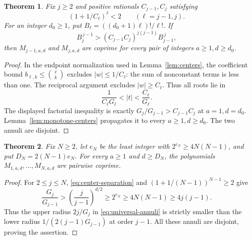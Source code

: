 \documentclass[11pt]{article}
\newtheorem{theorem}{Theorem}
\begin{document}
\begin{theorem}\label{thm:rational-annulus-cutoff}
Fix $j\ge2$ and positive rationals $C_{j-1},C_j$ satisfying
\[
 (1+1/C_\ell)^\ell<2\qquad(\ell=j-1,j).
\]
For an integer $d_0\ge1$, put
$B_\ell=((d_0+1)\ell)!/\ell!$.
If
\[
 B_j^{\,j-1}>
 (C_{j-1}C_j)^{j(j-1)}B_{j-1}^{\,j},
\]
then $M_{j-1,a,d}$ and $M_{j,a,d}$ are coprime for every pair
of integers $a\ge1,d\ge d_0$.
\end{theorem}
\begin{proof}
In the endpoint normalization used in Lemma~\ref{lem:centers},
the coefficient bound $b_{\ell,k}\le\binom\ell k$ excludes
$|w|\le1/C_\ell$: the sum of nonconstant terms is less than one.
The reciprocal argument excludes $|w|\ge C_\ell$.
Thus all roots lie in
\[
 \frac1{C_\ell G_\ell}<|t|<\frac{C_\ell}{G_\ell}.
\]
The displayed factorial inequality is exactly
$G_j/G_{j-1}>C_{j-1}C_j$ at $a=1,d=d_0$.
Lemma~\ref{lem:monotone-centers} propagates it to every
$a\ge1,d\ge d_0$. The two annuli are disjoint.
\end{proof}

\begin{theorem}\label{thm:gapbound}
Fix $N\ge2$, let $e_N$ be the least integer with
$2^{e_N}\ge4N(N-1)$, and put $D_N=2(N-1)e_N$.
For every $a\ge1$ and $d\ge D_N$, the polynomials
$M_{1,a,d},\ldots,M_{N,a,d}$ are pairwise coprime.
\end{theorem}
\begin{proof}
For $2\le j\le N$, \eqref{eq:center-separation} and
$(1+1/(N-1))^{N-1}\ge2$ give
\[
 \frac{G_j}{G_{j-1}}>
 \left(\frac{j}{j-1}\right)^{d/2}
 \ge 2^{e_N}\ge4N(N-1)\ge4j(j-1).
\]
Thus the upper radius $2j/G_j$ in \eqref{eq:universal-annuli} is strictly smaller than the
lower radius $1/(2(j-1)G_{j-1})$ at order $j-1$.
All these annuli are disjoint, proving the assertion.
\end{proof}
\end{document}
